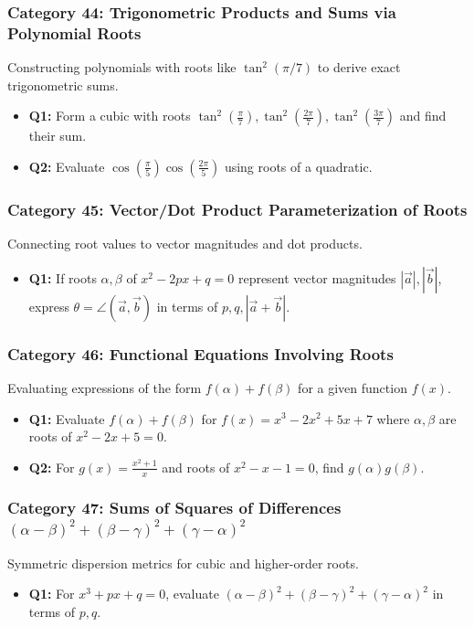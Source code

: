 \documentclass[10pt,a4paper]{article}
\begin{document}
\subsubsection{Category 44: Trigonometric Products and Sums via Polynomial Roots}
Constructing polynomials with roots like $\tan^2(\pi/7)$ to derive exact trigonometric sums.
\begin{itemize}[leftmargin=*]
    \item \textbf{Q1:} Form a cubic with roots $\tan^2(\frac{\pi}{7}), \tan^2(\frac{2\pi}{7}), \tan^2(\frac{3\pi}{7})$ and find their sum.
    \item \textbf{Q2:} Evaluate $\cos(\frac{\pi}{5})\cos(\frac{2\pi}{5})$ using roots of a quadratic.
\end{itemize}

\subsubsection{Category 45: Vector/Dot Product Parameterization of Roots}
Connecting root values to vector magnitudes and dot products.
\begin{itemize}[leftmargin=*]
    \item \textbf{Q1:} If roots $\alpha, \beta$ of $x^2 - 2px + q = 0$ represent vector magnitudes $|\vec{a}|, |\vec{b}|$, express $\theta = \angle(\vec{a},\vec{b})$ in terms of $p, q, |\vec{a}+\vec{b}|$.
\end{itemize}

\subsubsection{Category 46: Functional Equations Involving Roots}
Evaluating expressions of the form $f(\alpha) + f(\beta)$ for a given function $f(x)$.
\begin{itemize}[leftmargin=*]
    \item \textbf{Q1:} Evaluate $f(\alpha) + f(\beta)$ for $f(x) = x^3 - 2x^2 + 5x + 7$ where $\alpha, \beta$ are roots of $x^2 - 2x + 5 = 0$.
    \item \textbf{Q2:} For $g(x) = \frac{x^2+1}{x}$ and roots of $x^2 - x - 1 = 0$, find $g(\alpha)g(\beta)$.
\end{itemize}

\subsubsection{Category 47: Sums of Squares of Differences $(\alpha - \beta)^2 + (\beta - \gamma)^2 + (\gamma - \alpha)^2$}
Symmetric dispersion metrics for cubic and higher-order roots.
\begin{itemize}[leftmargin=*]
    \item \textbf{Q1:} For $x^3 + px + q = 0$, evaluate $(\alpha - \beta)^2 + (\beta - \gamma)^2 + (\gamma - \alpha)^2$ in terms of $p, q$.
\end{itemize}
\end{document}
